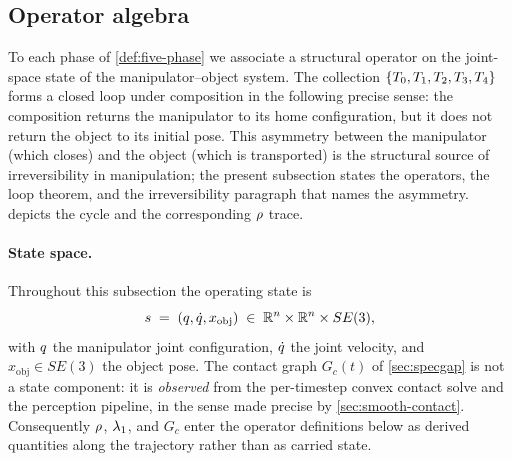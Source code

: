 \subsection{Operator algebra}
\label{sec:operator-algebra}

To each phase of \cref{def:five-phase} we associate a structural
operator on the joint-space state of the manipulator--object
system. The collection $\{T_{0}, T_{1}, T_{2},
T_{3}, T_{4}\}$ forms a closed loop under composition
in the following precise sense: the composition returns the
manipulator to its home configuration, but it does not return the
object to its initial pose. This asymmetry between the
manipulator (which closes) and the object (which is transported)
is the structural source of irreversibility in manipulation; the
present subsection states the operators, the loop theorem, and
the irreversibility paragraph that names the asymmetry.
 depicts the cycle and the corresponding
$\rho$ trace.

\paragraph{State space.}
Throughout this subsection the operating state is
\begin{equation}
\label{eq:operator-state}
  s \;=\; (q, \dot{q}, x_{\mathrm{obj}})
  \;\in\; \mathbb{R}^{n} \times \mathbb{R}^{n} \times SE(3),
\end{equation}
with $q$ the manipulator joint configuration,
$\dot{q}$ the joint velocity, and
$x_{\mathrm{obj}} \in SE(3)$ the object pose. The contact graph
$G_{c}(t)$ of \cref{sec:specgap} is not a state component: it is
\emph{observed} from the per-timestep convex contact solve and
the perception pipeline, in the sense made precise by
\cref{sec:smooth-contact}. Consequently $\rho$, $\lambda_{1}$,
and $G_{c}$ enter the operator definitions below as derived
quantities along the trajectory rather than as carried state.

